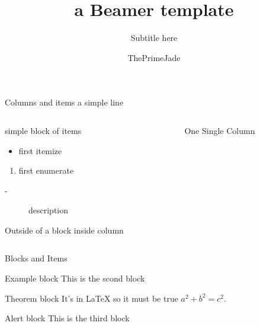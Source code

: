 \documentclass{beamer}
\title[Beamer]{a Beamer template}
\subtitle{Subtitle here}
\author{ThePrimeJade}
\institute{\large \textbf{Bold text}: \\[6pt] Text one}
\date{}
\begin{document}
\begin{frame}
    \maketitle
\end{frame}

\begin{frame}[t]{Columns and items} \vspace{2mm}
a simple line
    \begin{columns}
        \begin{column}[]{.5\textwidth}
            \begin{block}{simple block of items}
                \begin{itemize}
                    \item first itemize
                \end{itemize}
                \begin{enumerate}
                    \item first enumerate
                \end{enumerate}
                \begin{description}
                    \item[-] description
                \end{description}
            \end{block}
            \vspace{2em}
    Outside of a block inside column
        \end{column}

        \begin{column}[]{.5\textwidth}
            One Single Column
        \end{column}
    \end{columns}
\end{frame}
\begin{frame}[t]{Blocks and Items} \vspace{2mm}

    \begin{exampleblock}{Example block}
        This is the scond block
    \end{exampleblock}

    \begin{theorem}{Theorem block}
        It's in {\LaTeX} so it must be true $ a^2 + b^2 = c^2$.
    \end{theorem}

    \begin{alertblock}{Alert block}
        This is the third block
    \end{alertblock}
\end{frame}
\end{document}
